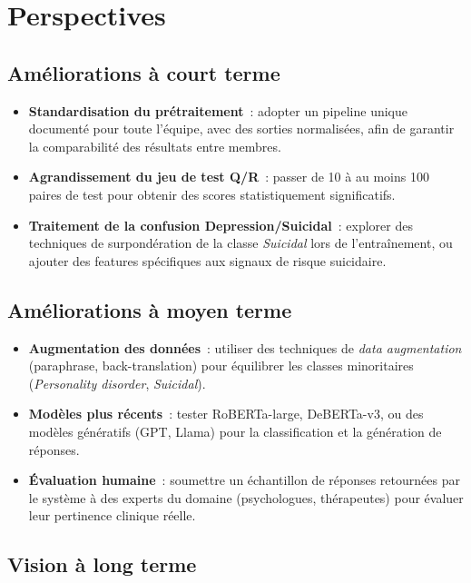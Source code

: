 \documentclass[12pt,a4paper]{report}
\begin{document}
\chapter{Perspectives}

\section{Améliorations à court terme}

\begin{itemize}
  \item \textbf{Standardisation du prétraitement}~: adopter un pipeline unique documenté
    pour toute l'équipe, avec des sorties normalisées, afin de garantir la comparabilité
    des résultats entre membres.
  \item \textbf{Agrandissement du jeu de test Q/R}~: passer de 10 à au moins 100 paires
    de test pour obtenir des scores statistiquement significatifs.
  \item \textbf{Traitement de la confusion Depression/Suicidal}~: explorer des techniques
    de surpondération de la classe \textit{Suicidal} lors de l'entraînement, ou ajouter
    des features spécifiques aux signaux de risque suicidaire.
\end{itemize}

\section{Améliorations à moyen terme}

\begin{itemize}
  \item \textbf{Augmentation des données}~: utiliser des techniques de \textit{data
    augmentation} (paraphrase, back-translation) pour équilibrer les classes minoritaires
    (\textit{Personality disorder}, \textit{Suicidal}).
  \item \textbf{Modèles plus récents}~: tester RoBERTa-large, DeBERTa-v3, ou des modèles
    génératifs (GPT, Llama) pour la classification et la génération de réponses.
  \item \textbf{Évaluation humaine}~: soumettre un échantillon de réponses retournées par
    le système à des experts du domaine (psychologues, thérapeutes) pour évaluer leur
    pertinence clinique réelle.
\end{itemize}

\section{Vision à long terme}
\end{document}
